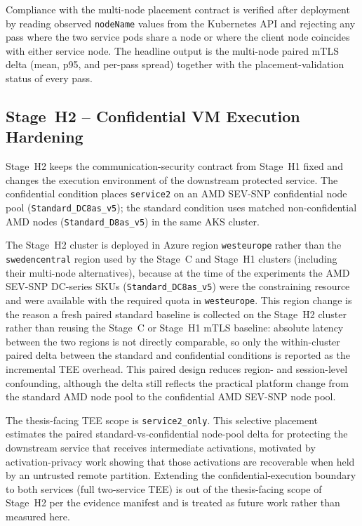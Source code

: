 Compliance with the multi-node placement contract is verified after deployment by reading
observed \texttt{nodeName} values from the Kubernetes API and rejecting any pass where the
two service pods share a node or where the client node coincides with either service node.
The headline output is the multi-node paired mTLS delta (mean, p95, and per-pass spread)
together with the placement-validation status of every pass.

\subsection{Stage~H2 -- Confidential VM Execution Hardening}
\label{sec:methods-rq22}

Stage~H2 keeps the communication-security contract from Stage~H1 fixed and changes the
execution environment of the downstream protected service.
The confidential condition places \texttt{service2} on an AMD SEV-SNP confidential
node pool (\texttt{Standard\_DC8as\_v5}); the standard condition uses matched
non-confidential AMD nodes (\texttt{Standard\_D8as\_v5}) in the same AKS cluster.

The Stage~H2 cluster is deployed in Azure region \texttt{westeurope} rather than the
\texttt{swedencentral} region used by the Stage~C and Stage~H1 clusters (including their
multi-node alternatives), because at
the time of the experiments the AMD SEV-SNP DC-series SKUs (\texttt{Standard\_DC8as\_v5})
were the constraining resource and were available with the required quota in
\texttt{westeurope}. This region change is the reason a fresh paired standard baseline is
collected on the Stage~H2 cluster rather than reusing the Stage~C or Stage~H1 mTLS baseline:
absolute latency between the two regions is not directly comparable, so only the
within-cluster paired delta between the standard and confidential conditions is reported
as the incremental TEE overhead.
This paired design reduces region- and session-level confounding, although the delta
still reflects the practical platform change from the standard AMD node pool to the
confidential AMD SEV-SNP node pool.

The thesis-facing TEE scope is \texttt{service2\_only}.
This selective placement estimates the paired standard-vs-confidential node-pool
delta for protecting the downstream service that receives intermediate activations,
motivated by activation-privacy work
\cite{he2021_attacking_collaborative} showing that those activations are
recoverable when held by an untrusted remote partition.
Extending the confidential-execution boundary to both services (full
two-service TEE) is out of the thesis-facing scope of Stage~H2 per the evidence
manifest and is treated as future work rather than measured here.

